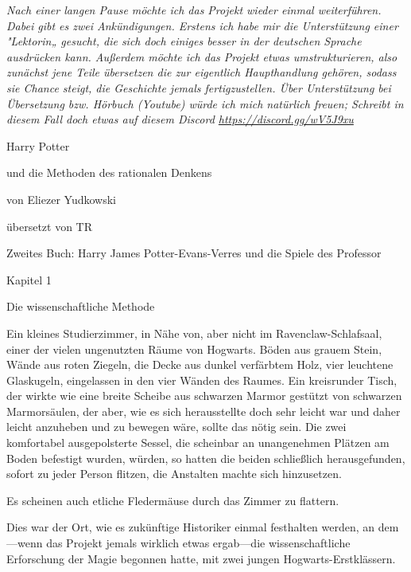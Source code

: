 

\hypertarget{die-wissenschaftliche-methode}{%

\emph{Nach einer langen Pause möchte ich das Projekt wieder einmal weiterführen. Dabei gibt es zwei Ankündigungen. Erstens ich habe mir die Unterstützung einer "Lektorin„ gesucht, die sich doch einiges besser in der deutschen Sprache ausdrücken kann. Außerdem möchte ich das Projekt etwas umstrukturieren, also zunächst jene Teile übersetzen die zur eigentlich Haupthandlung gehören, sodass sie Chance steigt, die Geschichte jemals fertigzustellen. Über Unterstützung bei Übersetzung bzw. Hörbuch (Youtube) würde ich mich natürlich freuen; Schreibt in diesem Fall doch etwas auf diesem Discord \url{https://discord.gg/wV5J9xu} ~}

Harry Potter

und die Methoden des rationalen Denkens

von Eliezer Yudkowski

übersetzt von TR

Zweites Buch: Harry James Potter-Evans-Verres und die Spiele des Professor

Kapitel 1

Die wissenschaftliche Methode

Ein kleines Studierzimmer, in Nähe von, aber nicht im Ravenclaw-Schlafsaal, einer der vielen ungenutzten Räume von Hogwarts. Böden aus grauem Stein, Wände aus roten Ziegeln, die Decke aus dunkel verfärbtem Holz, vier leuchtene Glaskugeln, eingelassen in den vier Wänden des Raumes. Ein kreisrunder Tisch, der wirkte wie eine breite Scheibe aus schwarzen Marmor gestützt von schwarzen Marmorsäulen, der aber, wie es sich herausstellte doch sehr leicht war und daher leicht anzuheben und zu bewegen wäre, sollte das nötig sein. Die zwei komfortabel ausgepolsterte Sessel, die scheinbar an unangenehmen Plätzen am Boden befestigt wurden, würden, so hatten die beiden schließlich herausgefunden, sofort zu jeder Person flitzen, die Anstalten machte sich hinzusetzen.

Es scheinen auch etliche Fledermäuse durch das Zimmer zu flattern.

Dies war der Ort, wie es zukünftige Historiker einmal festhalten werden, an dem—wenn das Projekt jemals wirklich etwas ergab—die wissenschaftliche Erforschung der Magie begonnen hatte, mit zwei jungen Hogwarts-Erstklässern.

}
